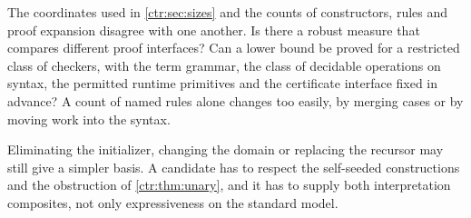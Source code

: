 \begin{question}
The coordinates used in \cref{ctr:sec:sizes} and the counts of constructors, rules and
proof expansion disagree with one another. Is there a robust measure that compares
different proof interfaces? Can a lower bound be proved for a restricted class of checkers,
with the term grammar, the class of decidable operations on syntax, the permitted runtime
primitives and the certificate interface fixed in advance? A count of named rules alone
changes too easily, by merging cases or by moving work into the syntax.
\end{question}

\begin{question}
Eliminating the initializer, changing the domain or replacing the recursor may still give a
simpler basis. A candidate has to respect the self-seeded constructions and the obstruction
of \cref{ctr:thm:unary}, and it has to supply both interpretation composites, not only
expressiveness on the standard model.
\end{question}

